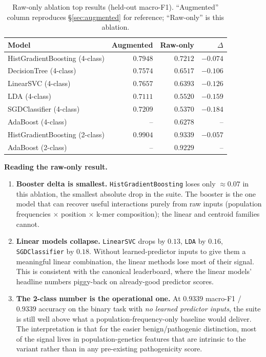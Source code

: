 \documentclass[11pt,a4paper]{article}
\begin{document}
\begin{table}[H]
\centering
\caption{Raw-only ablation top results (held-out macro-F1). ``Augmented''
column reproduces \S\ref{sec:augmented} for reference; ``Raw-only'' is this
ablation.}
\label{tab:raw-only}
\small
\begin{tabular}{lrrr}
\toprule
Model & Augmented & Raw-only & $\Delta$ \\
\midrule
HistGradientBoosting (4-class) & $0.7948$ & $0.7212$ & $-0.074$ \\
DecisionTree         (4-class) & $0.7574$ & $0.6517$ & $-0.106$ \\
LinearSVC            (4-class) & $0.7657$ & $0.6393$ & $-0.126$ \\
LDA                  (4-class) & $0.7111$ & $0.5520$ & $-0.159$ \\
SGDClassifier        (4-class) & $0.7209$ & $0.5370$ & $-0.184$ \\
AdaBoost             (4-class) & --       & $0.6278$ & --       \\
\midrule
HistGradientBoosting (2-class) & $0.9904$ & $0.9339$ & $-0.057$ \\
AdaBoost             (2-class) & --       & $0.9229$ & --       \\
\bottomrule
\end{tabular}
\end{table}

\textbf{Reading the raw-only result.}
\begin{enumerate}[leftmargin=*]
    \item \textbf{Booster delta is smallest.} \texttt{HistGradientBoosting}
          loses only $\approx 0.07$ in this ablation, the smallest absolute
          drop in the suite. The booster is the one model that can recover
          useful interactions purely from raw inputs (population frequencies
          $\times$ position $\times$ k-mer composition); the linear and
          centroid families cannot.
    \item \textbf{Linear models collapse.} \texttt{LinearSVC} drops by
          $0.13$, \texttt{LDA} by $0.16$, \texttt{SGDClassifier} by $0.18$.
          Without learned-predictor inputs to give them a meaningful linear
          combination, the linear methods lose most of their signal. This is
          consistent with the canonical leaderboard, where the linear models'
          headline numbers piggy-back on already-good predictor scores.
    \item \textbf{The 2-class number is the operational one.} At $0.9339$
          macro-F1 / $0.9339$ accuracy on the binary task with \emph{no
          learned predictor inputs}, the suite is still well above what a
          population-frequency-only baseline would deliver. The
          interpretation is that for the
          easier benign/pathogenic distinction, most of the signal lives in
          population-genetics features that are intrinsic to the variant
          rather than in any pre-existing pathogenicity score.
\end{enumerate}
\end{document}
